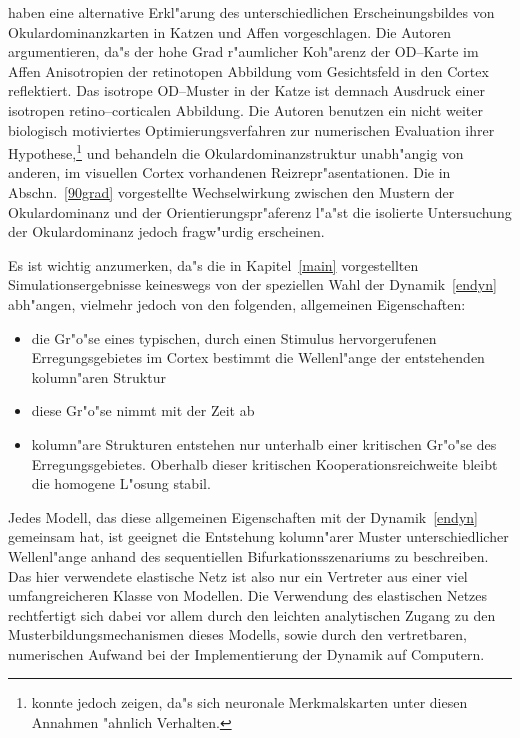  haben eine alternative Erkl"arung des
unterschiedlichen Erscheinungsbildes von Okulardominanzkarten in Katzen und
Affen vorgeschlagen. Die Autoren argumentieren, da"s der hohe Grad
r"aumlicher Koh"arenz der OD--Karte im Affen Anisotropien der retinotopen
Abbildung vom Gesichtsfeld in den Cortex reflektiert. Das isotrope OD--Muster
in der Katze ist demnach Ausdruck einer isotropen retino--corticalen
Abbildung.  Die Autoren benutzen ein nicht weiter biologisch motiviertes
Optimierungsverfahren zur numerischen Evaluation ihrer
Hypothese,\footnote{ konnte jedoch zeigen, da"s sich
neuronale Merkmalskarten unter diesen Annahmen "ahnlich Verhalten.} und
behandeln die Okulardominanzstruktur unabh"angig von anderen, im visuellen
Cortex vorhandenen Reizrepr"asentationen.  Die in Abschn.~\ref{90grad}
vorgestellte Wechselwirkung zwischen den Mustern der Okulardominanz und der
Orientierungspr"aferenz l"a"st die isolierte Untersuchung der
Okulardominanz jedoch fragw"urdig erscheinen.
\setcounter{footnote}{1}

Es ist wichtig anzumerken, da"s die in Kapitel~\ref{main} vorgestellten
Simulationsergebnisse keineswegs von der speziellen Wahl der
Dynamik~\eqref{endyn} abh"angen, vielmehr jedoch von den folgenden,
allgemeinen Eigenschaften:
 
\begin{itemize}
\item die Gr"o"se eines typischen, durch einen Stimulus hervorgerufenen
Erregungsgebietes im Cortex bestimmt die Wellenl"ange der entstehenden
kolumn"aren Struktur
\item diese Gr"o"se nimmt mit der Zeit ab
\item kolumn"are Strukturen entstehen nur unterhalb einer kritischen
Gr"o"se des Erregungsgebietes. Oberhalb dieser kritischen
Kooperationsreichweite bleibt die homogene L"osung stabil.
\end{itemize}

Jedes Modell, das diese allgemeinen Eigenschaften mit der
Dynamik~\eqref{endyn} gemeinsam hat, ist geeignet die Entstehung
kolumn"arer Muster unterschiedlicher Wellenl"ange anhand des sequentiellen
Bifurkationsszenariums zu beschreiben. Das hier verwendete
elastische Netz ist also nur ein Vertreter aus einer viel umfangreicheren
Klasse von Modellen. Die Verwendung des elastischen Netzes rechtfertigt
sich dabei vor allem durch den leichten analytischen Zugang zu den
Musterbildungsmechanismen dieses Modells, sowie durch den vertretbaren,
numerischen Aufwand bei der Implementierung der Dynamik auf Computern.

